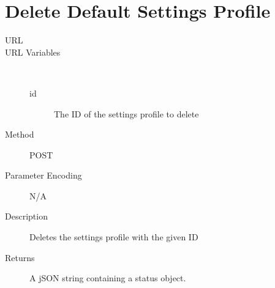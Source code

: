 \section{Delete Default Settings Profile}
\begin{description}
\item [URL] 
\item [URL Variables] \
	\begin{description}
	\item [id]  The ID of the settings profile to delete
	\end{description}
\item [Method] POST
\item [Parameter Encoding] N/A
\item [Description] Deletes the settings profile with the given ID
\item [Returns] A jSON string containing a status object.
\end{description}
